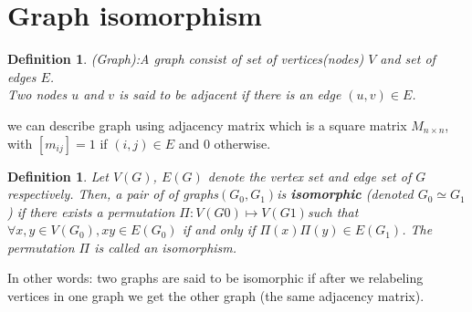 \documentclass[12pt,a4paper]{article}
\newtheorem{defn}[thm]{Definition}
\begin{document}
\section{Graph isomorphism}
\begin{defn}(Graph)\cite{gross2003handbook:5}:A graph consist of set of vertices(nodes) $V$ and set of edges $E$.\\
Two nodes $u$ and $v$ is said to be adjacent if there is an edge $(u,v) \in E$.
\end{defn}
we can describe graph using adjacency matrix which is a square matrix $M_{n\times n}$, with $[m_{ij}]=1 $ if $(i,j)\in E$ and $0$ otherwise.     
\begin{defn}
Let $V(G)$, $E(G)$ denote the vertex set and edge set of $G$ respectively. Then, a pair of of graphs$(G_0, G_1)$is \textbf{isomorphic} (denoted $G_0\simeq G_1$) if there exists a permutation $\Pi:V(G0)\longmapsto V(G1)$such that $\forall x,y \in V(G_0), xy\in E(G_0)$ if and only if $\Pi(x)\Pi(y)\in E(G_1)$. The permutation $\Pi$ is called an isomorphism.\cite{lec-notes1:3}
\end{defn}
In other words: two graphs are said to be isomorphic if after we relabeling vertices in one graph we get the other graph (the same adjacency matrix).
\end{document}
